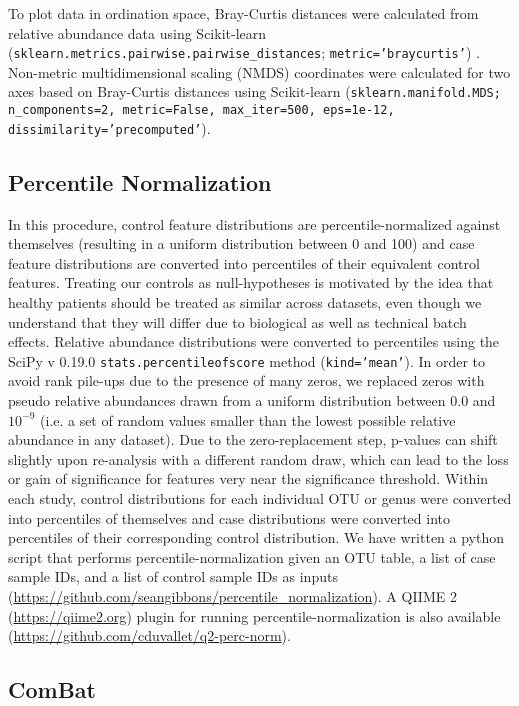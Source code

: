 To plot data in ordination space, Bray-Curtis distances were calculated from relative abundance data using Scikit-learn (\texttt{sklearn.metrics.pairwise.pairwise\_distances}; \texttt{metric='braycurtis'}) \cite{39}.
Non-metric multidimensional scaling (NMDS) coordinates were calculated for two axes based on Bray-Curtis distances using Scikit-learn (\texttt{sklearn.manifold.MDS; n\_components=2, metric=False, max\_iter=500, eps=1e-12, dissimilarity='precomputed'}).

\subsection{Percentile Normalization}

In this procedure, control feature distributions are percentile-normalized against themselves (resulting in a uniform distribution between 0 and 100) and case feature distributions are converted into percentiles of their equivalent control features.
Treating our controls as null-hypotheses is motivated by the idea that healthy patients should be treated as similar across datasets, even though we understand that they will differ due to biological as well as technical batch effects.
Relative abundance distributions were converted to percentiles using the SciPy v 0.19.0 \cite{40} \texttt{stats.percentileofscore} method (\texttt{kind='mean'}).
In order to avoid rank pile-ups due to the presence of many zeros, we replaced zeros with pseudo relative abundances drawn from a uniform distribution between 0.0 and $10^{-9}$ (i.e. a set of random values smaller than the lowest possible relative abundance in any dataset).
Due to the zero-replacement step, p-values can shift slightly upon re-analysis with a different random draw, which can lead to the loss or gain of significance for features very near the significance threshold.
Within each study, control distributions for each individual OTU or genus were converted into percentiles of themselves and case distributions were converted into percentiles of their corresponding control distribution.
We have written a python script that performs percentile-normalization given an OTU table, a list of case sample IDs, and a list of control sample IDs as inputs (\url{https://github.com/seangibbons/percentile_normalization}).
A QIIME 2 (\url{https://qiime2.org}) plugin for running percentile-normalization is also available (\url{https://github.com/cduvallet/q2-perc-norm}).

\subsection{ComBat}

